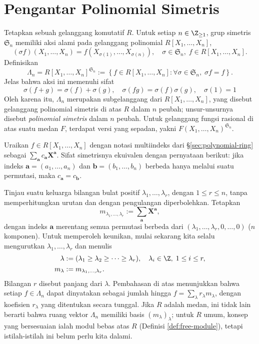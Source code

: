 \section{Pengantar Polinomial Simetris}\label{sec:symmetric-poly}
Tetapkan sebuah gelanggang komutatif $R$. Untuk setiap $n \in \Z_{\geq 1}$, grup simetris $\mathfrak{S}_n$ memiliki aksi alami pada gelanggang polinomial $R[X_1, \ldots, X_n]$,
\[ (\sigma f)(X_1, \ldots, X_n) = f(X_{\sigma(1)}, \ldots, X_{\sigma(n)}), \quad \sigma \in \mathfrak{S}_n, \; f \in R[X_1, \ldots, X_n]. \]
Definisikan
\[ \Lambda_n = R[X_1, \ldots, X_n]^{\mathfrak{S}_n} := \left\{ f \in R[X_1, \ldots, X_n] : \forall \sigma \in \mathfrak{S}_n, \; \sigma f = f \right\}. \]
Jelas bahwa aksi ini memenuhi sifat
\[ \sigma(f + g) = \sigma(f) + \sigma(g), \quad \sigma(fg) = \sigma(f) \sigma(g), \quad \sigma(1)=1 \]
Oleh karena itu, $\Lambda_n$ merupakan subgelanggang dari $R[X_1, \ldots, X_n]$, yang disebut gelanggang polinomial simetris di atas $R$ dalam $n$ peubah; unsur-unsurnya disebut \emph{polinomial simetris} dalam $n$ peubah. Untuk gelanggang fungsi rasional di atas suatu medan $F$, terdapat versi yang sepadan, yakni $F(X_1, \ldots, X_n)^{\mathfrak{S}_n}$.

Uraikan $f \in R[X_1, \ldots, X_n]$ dengan notasi multiindeks dari \S\ref{sec:polynomial-ring} sebagai $\sum_{\bm{a}} c_{\bm{a}} \bm{X}^{\bm{a}}$. Sifat simetrisnya ekuivalen dengan pernyataan berikut: jika indeks $\bm{a} = (a_1, \ldots, a_n)$ dan $\bm{b} = (b_1, \ldots, b_n)$ berbeda hanya melalui suatu permutasi, maka $c_{\bm{a}} = c_{\bm{b}}$.

Tinjau suatu keluarga bilangan bulat positif $\lambda_1, \ldots, \lambda_r$, dengan $1 \leq r \leq n$, tanpa memperhitungkan urutan dan dengan pengulangan diperbolehkan. Tetapkan
\[ m_{\lambda_1, \ldots, \lambda_r} := \sum_{\bm{a}} \bm{X}^{\bm{a}}, \]
dengan indeks $\bm{a}$ merentang semua permutasi berbeda dari $(\lambda_1, \ldots, \lambda_r, 0, \ldots, 0)$ ($n$ komponen). Untuk memperoleh keunikan, mulai sekarang kita selalu mengurutkan $\lambda_1, \ldots, \lambda_r$ dan menulis
\begin{align*}
	\lambda & := (\lambda_1 \geq \lambda_2 \geq \cdots \geq \lambda_r), \quad \lambda_i \in \Z, \; 1 \leq i \leq r, \\
	m_\lambda & := m_{\lambda_1, \ldots, \lambda_r}.
\end{align*}
Bilangan $r$ disebut panjang dari $\lambda$. Pembahasan di atas menunjukkan bahwa setiap $f \in \Lambda_n$ dapat dinyatakan sebagai jumlah hingga $f = \sum_\lambda r_\lambda m_\lambda$, dengan koefisien $r_\lambda$ yang ditentukan secara tunggal. Jika $R$ adalah medan, ini tidak lain berarti bahwa ruang vektor $\Lambda_n$ memiliki basis $(m_\lambda)_\lambda$; untuk $R$ umum, konsep yang bersesuaian ialah modul bebas atas $R$ (Definisi \ref{def:free-module}), tetapi istilah-istilah ini belum perlu kita dalami.


